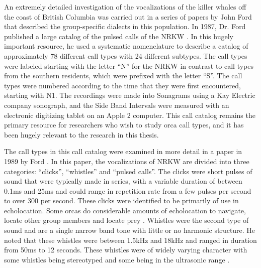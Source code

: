 \documentclass[12pt,oneside]{book}
\begin{document}
An extremely detailed investigation of the vocalizations of the killer
whales off the coast of British Columbia was carried out in a series
of papers by John Ford \cite{ford1982stocks} \cite{ford1983dialects}
that described the group-specific dialects in this population.  In
1987, Dr. Ford published a large catalog of the pulsed calls of the
NRKW \cite{ford1987catalogue}.  In this hugely
important resource, he used a systematic nomenclature to describe a
catalog of approximately 78 different call types with 24 different
subtypes.  The call types were labeled starting with the letter ``N'' for
the NRKW in contrast to call types from the southern
residents, which were prefixed with the letter ``S''.  The call types were
numbered according to the time that they were first encountered,
starting with N1.  The recordings were made into Sonagrams using a Kay
Electric company sonograph, and the Side Band Intervals were measured
with an electronic digitizing tablet on an Apple 2 computer.  This
call catalog remains the primary resource for researchers who wish to
study orca call types, and it has been hugely relevant to the research in
this thesis.

The call types in this call catalog were examined in more detail in a
paper in 1989 by Ford \cite{ford1989acoustic}.  In this paper, the
vocalizations of NRKW are divided into three categories: ``clicks'',
``whistles'' and ``pulsed calls''.  The clicks were short pulses of
sound that were typically made in series, with a variable duration of
between 0.1ms and 25ms and could range in repetition rate from a few
pulses per second to over 300 per second.  These clicks were
identified to be primarily of use in echolocation.  Some orcas do
considerable amounts of echolocation to navigate, locate other group
members and locate prey \cite{barretlennard1996echolocation}.
Whistles were the second type of sound and are a single narrow band
tone with little or no harmonic structure.  He noted that these
whistles were between 1.5kHz and 18kHz and ranged in duration from
50ms to 12 seconds.  These whistles were of widely varying character
with some whistles being stereotyped \cite{riesch2006stability} and
some being in the ultrasonic range \cite{samarra2010killer}
\cite{simonis2012high} \cite{filatova2012ultrasonic}.
\end{document}
